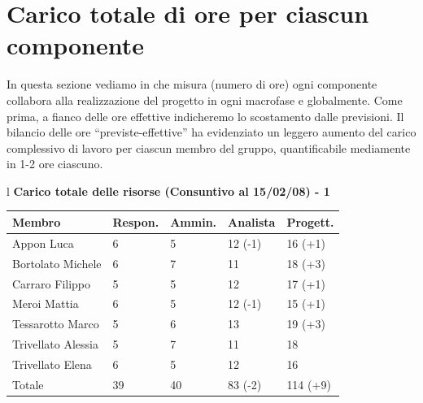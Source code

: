 \documentclass[11pt,titlepage,a4paper]{report}
\begin{document}
\newpage

\section{Carico totale di ore per ciascun componente}
In questa sezione vediamo in che misura (numero di ore) ogni componente collabora alla 
realizzazione del progetto in ogni macrofase e globalmente. Come prima, a fianco delle ore effettive indicheremo lo scostamento dalle previsioni.
Il bilancio delle ore ``previste-effettive'' ha evidenziato un leggero aumento del carico complessivo di lavoro per ciascun membro del gruppo, quantificabile mediamente in 1-2 ore ciascuno.


\begin{table}[hbtp]
\large{
\begin{tabular}{l}
\Large{\textbf{\textsf{Carico totale delle risorse (Consuntivo al 15/02/08) - 1}}} \\

\begin{tabular}{||p{3.5cm}||p{2cm}||p{2cm}||p{2cm}||p{2cm}||}
\hline
\textbf{Membro} & \textbf{Respon.} & \textbf{Ammin.} & \textbf{Analista}
& \textbf{Progett.}\\
\hline
{Appon Luca}&6&5&12 \footnotesize{(-1)}&16 \footnotesize{(+1)} \\ 
\hline 
{Bortolato Michele} &6&7&11&18 \footnotesize{(+3)}\\ 
\hline
{Carraro Filippo}&5&5&12&17 \footnotesize{(+1)} \\
\hline
{Meroi Mattia}&6&5&12 \footnotesize{(-1)}&15 \footnotesize{(+1)}\\
\hline
{Tessarotto Marco} &5&6&13&19 \footnotesize{(+3)}\\
\hline
{Trivellato Alessia} &5&7&11&18 \\
\hline
{Trivellato Elena} &6&5&12&16 \\
\hline
{Totale}& 39&40&83 \footnotesize{(-2)}&114 \footnotesize{(+9)} \\
\hline



\end{tabular} \\
\end{tabular}
}
\end{table}
\end{document}
